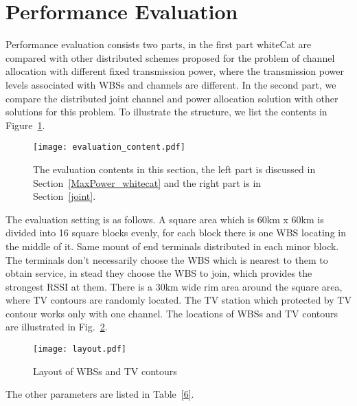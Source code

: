 \section{Performance Evaluation}
\label{simulation}
Performance evaluation consists two parts, in the first part whiteCat are compared with other distributed schemes proposed for the problem of channel allocation with different fixed transmission power, where the transmission power levels associated with WBSs and channels are different.
In the second part, we compare the distributed joint channel and power allocation solution with other solutions for this problem.
To illustrate the structure, we list the contents in Figure~\ref{evaluationContent}.

\begin{figure}[h!]
  \centering
  \texttt{[image: evaluation\_content.pdf]}
  \caption{The evaluation contents in this section, the left part is discussed in Section~\ref{MaxPower_whitecat} and the right part is in Section~\ref{joint}. 	}
\label{evaluationContent}
\end{figure}

The evaluation setting is as follows.
A square area which is 60km x 60km is divided into 16 square blocks evenly, for each block there is one WBS locating in the middle of it. 
Same mount of end terminals distributed in each minor block.
The terminals don't necessarily choose the WBS which is nearest to them to obtain service, in stead they choose the WBS to join, which provides the strongest \gls{RSSI} at them.
There is a 30km wide rim area around the square area, where TV contours are randomly located.
The TV station which protected by TV contour works only with one channel. 
The locations of WBSs and TV contours are illustrated in Fig.~\ref{sim:layout}.
\begin{figure}[h!]
  \centering
  \texttt{[image: layout.pdf]}
  \caption{Layout of WBSs and TV contours}
  \label{sim:layout}
\end{figure}

The other parameters are listed in Table~\ref{6}.

